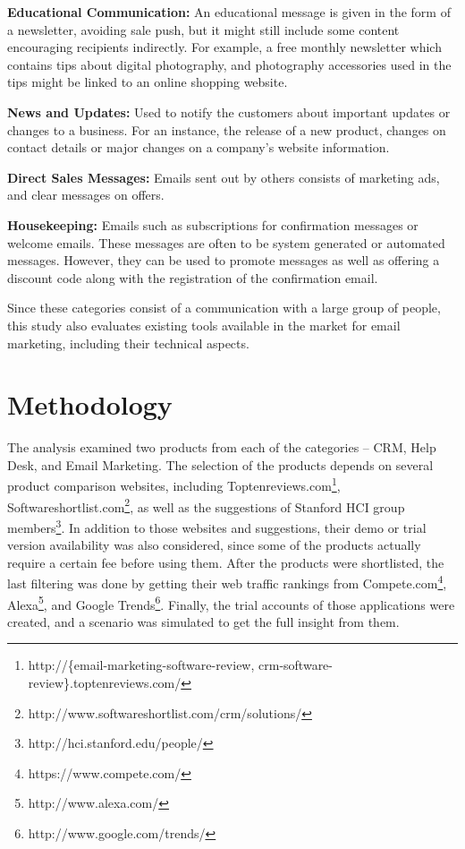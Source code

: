 \begin{compactitem}
	\item \textbf{Educational Communication:} An educational message is given in the form of a newsletter, avoiding sale push, but it might still include some content encouraging recipients indirectly. For example, a free monthly newsletter which contains tips about digital photography, and photography accessories used in the tips might be linked to an online shopping website. 
	\item \textbf{News and Updates:} Used to notify the customers about important updates or changes to a business. For an instance, the release of a new product, changes on contact details or major changes on a company's website information.
	\item \textbf{Direct Sales Messages:} Emails sent out by others consists of marketing ads, and clear messages on offers.
	\item \textbf{Housekeeping:} Emails such as subscriptions for confirmation messages or welcome emails. These messages are often to be system generated or automated messages. However, they can be used to promote messages as well as offering a discount code along with the registration of the confirmation email.
\end{compactitem}

Since these categories consist of a communication with a large group of people, this study also evaluates existing tools available in the market for email marketing, including their technical aspects.

\section{Methodology}
\label{sec:3.2:Meth}

The analysis examined two products from each of the categories -- \ac{CRM}, Help Desk, and Email Marketing. The selection of the products depends on several product comparison websites, including Toptenreviews.com\footnote{http://\{email-marketing-software-review, crm-software-review\}.toptenreviews.com/ }, Softwareshortlist.com\footnote{http://www.softwareshortlist.com/crm/solutions/}, as well as the suggestions of Stanford HCI group members\footnote{http://hci.stanford.edu/people/}. In addition to those websites and suggestions, their demo or trial version availability was also considered, since some of the products actually require a certain fee before using them. After the products were shortlisted, the last filtering was done by getting their web traffic rankings from Compete.com\footnote{https://www.compete.com/}, Alexa\footnote{http://www.alexa.com/}, and Google Trends\footnote{http://www.google.com/trends/}. Finally, the trial accounts of those applications were created, and a scenario was simulated to get the full insight from them. 

